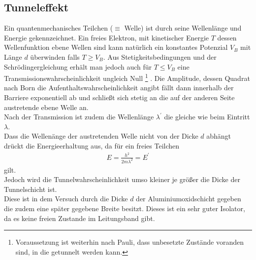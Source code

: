 \documentclass[twoside,        %
               BCOR12mm,       %
               english,ngerman, %
               fleqn,headsepline=false,footsepline=false
              ]{MFPREPORT}
\begin{document}
\subsection{Tunneleffekt}
Ein quantenmechanisches Teilchen ($\equiv$ Welle) ist durch seine Wellenlänge und Energie gekennzeichnet. 
Ein freies Elektron, mit kinetischer Energie $T$ dessen Wellenfunktion ebene Wellen sind kann natürlich ein konstantes Potenzial $V_{B}$ mit Länge $d$ überwinden falls $T \geq V_{B}$.
Aus Stetigkeitsbedingungen und der Schrödingergleichung erhält man jedoch auch für $T \leq V_{B}$ eine Transmissionswahrscheinlichkeit ungleich Null
\footnote{Voraussetzung ist weiterhin nach Pauli, dass unbesetzte Zustände voranden sind, in die getunnelt werden kann.} .
Die Amplitude, dessen Quadrat nach Born die Aufenthaltswahrscheinlichkeit angibt fällt dann innerhalb der Barriere exponentiell ab und schließt sich stetig an die auf der anderen Seite austretende ebene Welle an.
\\
Nach der Transmission ist zudem die Wellenlänge $\lambda^{\prime}$ die gleiche wie beim Eintritt $\lambda$.
\\
Dass die Wellenänge der austretenden Welle nicht von der Dicke $d$ abhängt drückt die Energieerhaltung aus,
da für ein freies Teilchen
\begin{align}
E = \frac{h^2}{2 m \lambda^2} = E^{\prime}
\end{align}
gilt.
\\
Jedoch wird die Tunnelwahrscheinlichkeit umso kleiner je größer die Dicke der Tunnelschicht ist.
\\
Diese ist in dem Versuch durch die Dicke $d$ der Aluminiumoxidschicht gegeben die zudem eine später gegebene Breite besitzt.
Dieses ist ein sehr guter Isolator, da es keine freien Zustande im Leitungsband gibt.
\end{document}
